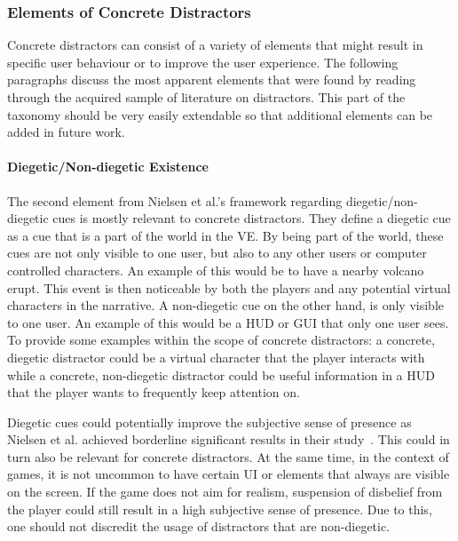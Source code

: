 \subsubsection{Elements of Concrete Distractors}
Concrete distractors can consist of a variety of elements that might result in specific user behaviour or to improve the user experience. The following paragraphs discuss the most apparent elements that were found by reading through the acquired sample of literature on distractors. This part of the taxonomy should be very easily extendable so that additional elements can be added in future work. 

\paragraph{Diegetic/Non-diegetic Existence}
The second element from Nielsen et al.'s framework regarding diegetic/non-diegetic cues is mostly relevant to concrete distractors. They define a diegetic cue as a cue that is a part of the world in the VE. By being part of the world, these cues are not only visible to one user, but also to any other users or computer controlled characters. An example of this would be to have a nearby volcano erupt. This event is then noticeable by both the players and any potential virtual characters in the narrative. A non-diegetic cue on the other hand, is only visible to one user. An example of this would be a HUD or GUI that only one user sees. To provide some examples within the scope of concrete distractors: a concrete, diegetic distractor could be a virtual character that the player interacts with while a concrete, non-diegetic distractor could be useful information in a HUD that the player wants to frequently keep attention on.

Diegetic cues could potentially improve the subjective sense of presence as Nielsen et al. achieved borderline significant results in their study~\cite{nielsen2016missing}. This could in turn also be relevant for concrete distractors. At the same time, in the context of games, it is not uncommon to have certain UI or elements that always are visible on the screen. If the game does not aim for realism, suspension of disbelief from the player could still result in a high subjective sense of presence. Due to this, one should not discredit the usage of distractors that are non-diegetic.

